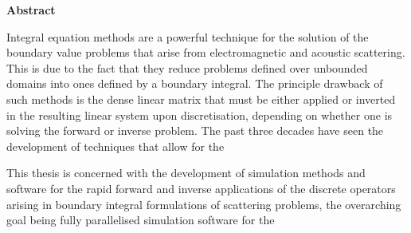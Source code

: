 \thispagestyle{plain}

\begin{center}
    \textbf{Abstract}
\end{center}

Integral equation methods are a powerful technique for the solution of the boundary value problems that arise from electromagnetic and acoustic scattering. This is due to the fact that they reduce problems defined over unbounded domains into ones defined by a boundary integral. The principle drawback of such methods is the dense linear matrix that must be either applied or inverted in the resulting linear system upon discretisation, depending on whether one is solving the forward or inverse problem. The past three decades have seen the development of techniques that allow for the

This thesis is concerned with the development of simulation methods and software for the rapid forward and inverse applications of the discrete operators arising in boundary integral formulations of scattering problems, the overarching goal being fully parallelised simulation software for the
